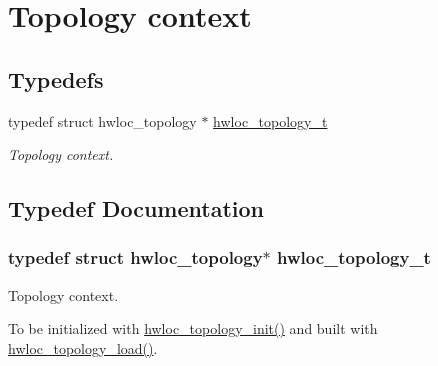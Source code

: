 \hypertarget{group__hwlocality__topology}{
\section{Topology context}
\label{group__hwlocality__topology}
}
\subsection*{Typedefs}
\begin{CompactItemize}
\item 
typedef struct hwloc\_\-topology $\ast$ \hyperlink{group__hwlocality__topology_g9d1e76ee15a7dee158b786c30b6a6e38}{hwloc\_\-topology\_\-t}
\begin{CompactList}\small\item\em Topology context. \item\end{CompactList}\end{CompactItemize}


\subsection{Typedef Documentation}
\hypertarget{group__hwlocality__topology_g9d1e76ee15a7dee158b786c30b6a6e38}{
\subsubsection[{hwloc\_\-topology\_\-t}]{\setlength{\rightskip}{0pt plus 5cm}typedef struct hwloc\_\-topology$\ast$ {\bf hwloc\_\-topology\_\-t}}}
\label{group__hwlocality__topology_g9d1e76ee15a7dee158b786c30b6a6e38}


Topology context. 

To be initialized with \hyperlink{group__hwlocality__creation_g03fd4a16d8b9ee1ffc32b25fd2f6bdfa}{hwloc\_\-topology\_\-init()} and built with \hyperlink{group__hwlocality__creation_gbdf58d87ad77f6615fccdfe0535ff826}{hwloc\_\-topology\_\-load()}. 

